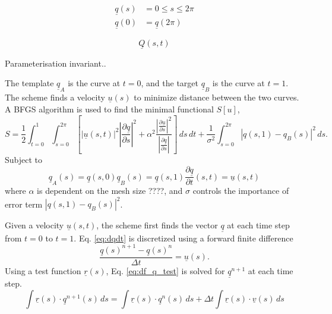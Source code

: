 \documentclass[a4paper, 10pt]{article}
\newcommand{\eq}[1]{Eq. \ref{eq:#1}}
\newcommand{\vect}[1]{\ensuremath{\underline{#1}}}
\begin{document}
\begin{align*}
  \vect q(s) &= 0 \leq s \leq 2\pi \\
  \vect q(0) &= \vect q(2\pi)
\end{align*}

\begin{equation}
  \label{eq:q}
  \vect Q(s,t)
\end{equation}

Parameterisation invariant..


The template $\vect q_A$ is the curve at $t=0$, and the target $\vect q_B$
is the curve at $t=1$. The scheme finds a velocity $\vect u(s)$ to minimize
distance between the two curves. A BFGS algorithm is used to find the minimal
functional $S[u]$,
\begin{equation}
  \label{eq:S}
  S = \frac{1}{2} \int^{1}_{t=0} \int^{2\pi}_{s=0}\left[ \left| \vect u(s,t) \right|^2 
  \left| \frac{\partial \vect q}{\partial s} \right|^2  + 
  \alpha^2 \frac{ 
    \left| \frac{\partial \vect u}{\partial s}\right|^2}{
    \left| \frac{\partial \vect q}{\partial s}\right|}\right]  \,ds\,dt
  + \frac{1}{\sigma^2}\int^{2\pi}_{s=0}\left| q(s,1) - q_B(s)\right|^2\,ds.
\end{equation}
Subject to
\begin{subequations}
\begin{equation}
  \vect q_A(s) =\vect q(s,0)   \label{eq:template}
\end{equation}
\begin{equation}
  \vect q_B(s) = \vect q(s,1) \label{eq:target}
\end{equation}
\begin{equation}
  \frac{\partial \vect q}{\partial t}(s,t) = \vect u(s,t)  \label{eq:dqdt}
\end{equation}
\end{subequations}
where $\alpha$ is dependent on the mesh size ????, and $\sigma$ controls the importance
of error term $\left| q(s,1) - q_B(s)\right|^2$.


Given a velocity $\vect u(s,t)$, the scheme first finds the vector $\vect q$ at
each time step from $t=0$ to $t=1$. \eq{dqdt} is discretized using a forward finite difference
\begin{equation}
  \label{eq:fd_q}
  \frac{\vect q(s)^{n+1}- \vect q(s)^n}{\Delta t} = \vect u(s).
\end{equation}
Using a test function $\vect r(s)$, \eq{df_q_test} is solved for $\vect q^{n+1}$
at each time step.
  \begin{equation}
    \label{eq:df_q_test}
    \int \vect{r}(s) \cdot \vect{q}^{n+1}(s)\, ds = \int \vect{r}(s) \cdot
    \vect{q}^n (s)\,ds + \Delta t \int \vect{r}(s)\cdot \vect{v}(s)\, ds
  \end{equation}
\end{document}
